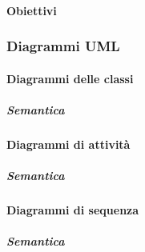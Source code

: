 		\paragraph{Obiettivi}\label{PP:Sviluppo:Progettazione:Obiettivi}
		 
		 
		\subsubsection{Diagrammi UML}\label{PP:Sviluppo:UML} %
		
		\paragraph{Diagrammi delle classi} %
		
		\subparagraph{Semantica} %
		
		
		\paragraph{Diagrammi di attività} %
		
		\subparagraph{Semantica} %
		
		
		\paragraph{Diagrammi di sequenza} %
		
		\subparagraph{Semantica} %
		


